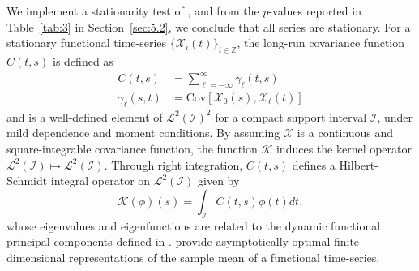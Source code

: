 \documentclass[12pt,a4paper]{article}
\newcommand{\X}{\mathcal{X}}
\begin{document}
We implement a stationarity test of \cite{HKR14}, and from the $p$-values reported in Table~\ref{tab:3} in Section~\ref{sec:5.2}, we conclude that all series are stationary. For a stationary functional time-series $\{\X_i(t)\}_{i\in \mathbb{Z}}$, the long-run covariance function $C(t,s)$ is defined as
\begin{align*}
C(t,s) &= \sum_{\ell=-\infty}^{\infty}\gamma_{\ell}(t,s) \\
\gamma_{\ell}(s,t) &= \text{Cov}[\X_0(s), \X_{\ell}(t)]
\end{align*}
and is a well-defined element of $\mathcal{L}^2(\mathcal{I})^2$ for a compact support interval $\mathcal{I}$, under mild dependence and moment conditions. By assuming $\X$ is a continuous and square-integrable covariance function, the function $\mathcal{K}$ induces the kernel operator $\mathcal{L}^2(\mathcal{I})\mapsto \mathcal{L}^2(\mathcal{I})$. Through right integration, $C(t,s)$ defines a Hilbert-Schmidt integral operator on $\mathcal{L}^2(\mathcal{I})$ given by
\begin{equation*}
\mathcal{K}(\phi)(s) = \int_{\mathcal{I}}C(t,s)\phi(t)dt,
\end{equation*}
whose eigenvalues and eigenfunctions are related to the dynamic functional principal components defined in \cite{HKH15}. \cite{HKH15} provide asymptotically optimal finite-dimensional representations of the sample mean of a functional time-series.
\end{document}
